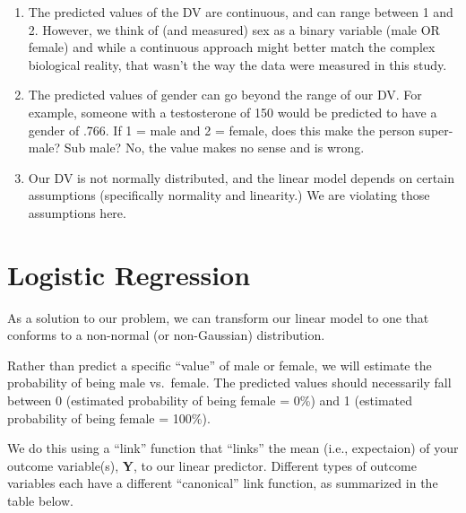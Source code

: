\documentclass[
  letterpaper,
  DIV=11,
  numbers=noendperiod,
  oneside]{scrreprt}
\begin{document}
\begin{tcolorbox}[enhanced jigsaw, toptitle=1mm, toprule=.15mm, rightrule=.15mm, breakable, left=2mm, colbacktitle=quarto-callout-tip-color!10!white, colback=white, opacityback=0, coltitle=black, bottomtitle=1mm, opacitybacktitle=0.6, titlerule=0mm, leftrule=.75mm, arc=.35mm, bottomrule=.15mm, title=\textcolor{quarto-callout-tip-color}{\faLightbulb}\hspace{0.5em}{What Professor Thinks Went Wrong (Think On Ur Own First?)}, colframe=quarto-callout-tip-color-frame]

\begin{enumerate}
\def\labelenumi{\arabic{enumi}.}
\item
  The predicted values of the DV are continuous, and can range between 1
  and 2. However, we think of (and measured) sex as a binary variable
  (male OR female) and while a continuous approach might better match
  the complex biological reality, that wasn't the way the data were
  measured in this study.
\item
  The predicted values of gender can go beyond the range of our DV. For
  example, someone with a testosterone of 150 would be predicted to have
  a gender of .766. If 1 = male and 2 = female, does this make the
  person super-male? Sub male? No, the value makes no sense and is
  wrong.
\item
  Our DV is not normally distributed, and the linear model depends on
  certain assumptions (specifically normality and linearity.) We are
  violating those assumptions here.
\end{enumerate}

\end{tcolorbox}

\section{Logistic Regression}\label{logistic-regression-1}

As a solution to our problem, we can transform our linear model to one
that conforms to a non-normal (or non-Gaussian) distribution.

Rather than predict a specific ``value'' of male or female, we will
estimate the probability of being male vs.~female. The predicted values
should necessarily fall between 0 (estimated probability of being female
= 0\%) and 1 (estimated probability of being female = 100\%).

We do this using a ``link'' function that ``links'' the mean (i.e.,
expectaion) of your outcome variable(s), \textbf{Y}, to our linear
predictor. Different types of outcome variables each have a different
``canonical'' link function, as summarized in the table below.
\end{document}
